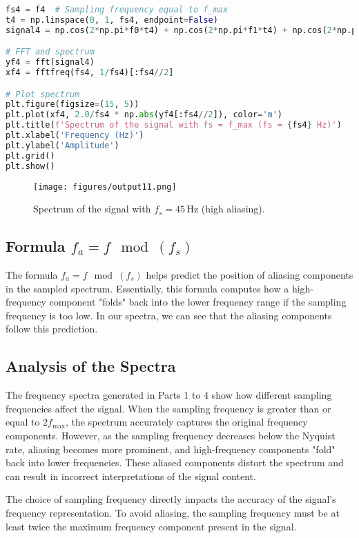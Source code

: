\documentclass[10pt]{article}
\theoremstyle{definition}
\theoremstyle{remark}
\theoremstyle{definition}
\numberwithin{equation}{prob}
\begin{document}
\begin{lstlisting}[language=Python]
fs4 = f4  # Sampling frequency equal to f_max
t4 = np.linspace(0, 1, fs4, endpoint=False)
signal4 = np.cos(2*np.pi*f0*t4) + np.cos(2*np.pi*f1*t4) + np.cos(2*np.pi*f2*t4) + np.cos(2*np.pi*f3*t4) + np.cos(2*np.pi*f4*t4)

# FFT and spectrum
yf4 = fft(signal4)
xf4 = fftfreq(fs4, 1/fs4)[:fs4//2]

# Plot spectrum
plt.figure(figsize=(15, 5))
plt.plot(xf4, 2.0/fs4 * np.abs(yf4[:fs4//2]), color='m')
plt.title(f'Spectrum of the signal with fs = f_max (fs = {fs4} Hz)')
plt.xlabel('Frequency (Hz)')
plt.ylabel('Amplitude')
plt.grid()
plt.show()
\end{lstlisting}

\begin{figure}[H]
    \centering
    \texttt{[image: figures/output11.png]}  
    \caption{Spectrum of the signal with \( f_s = 45 \, \text{Hz} \) (high aliasing).}
\end{figure}

\subsection{Formula \( f_a = f \mod (f_s) \)}

The formula \( f_a = f \mod (f_s) \) helps predict the position of aliasing components in the sampled spectrum. Essentially, this formula computes how a high-frequency component "folds" back into the lower frequency range if the sampling frequency is too low. In our spectra, we can see that the aliasing components follow this prediction.

\subsection{Analysis of the Spectra}

The frequency spectra generated in Parts 1 to 4 show how different sampling frequencies affect the signal. When the sampling frequency is greater than or equal to \( 2f_{\text{max}} \), the spectrum accurately captures the original frequency components. However, as the sampling frequency decreases below the Nyquist rate, aliasing becomes more prominent, and high-frequency components "fold" back into lower frequencies. These aliased components distort the spectrum and can result in incorrect interpretations of the signal content.

The choice of sampling frequency directly impacts the accuracy of the signal's frequency representation. To avoid aliasing, the sampling frequency must be at least twice the maximum frequency component present in the signal.
\end{document}
